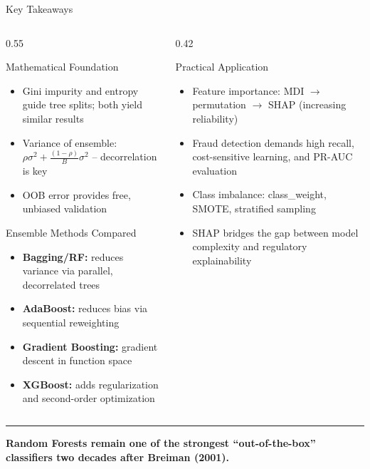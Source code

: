 \documentclass[8pt,aspectratio=169]{beamer}
\newcommand{\bottomnote}[1]{%
\vfill
\vspace{-2mm}
\textcolor{mllavender2}{\rule{\textwidth}{0.4pt}}
\vspace{1mm}
\footnotesize
\textbf{#1}
}
\newenvironment{compactlist}{%
  \begin{itemize}%
    \setlength{\itemsep}{2pt}%
    \setlength{\parskip}{0pt}%
    \setlength{\parsep}{0pt}%
}{%
  \end{itemize}%
}
\begin{document}

\begin{frame}{Key Takeaways}
\begin{columns}[T]
\begin{column}{0.55\textwidth}
\small
\begin{block}{Mathematical Foundation}
\begin{compactlist}
\item Gini impurity and entropy guide tree splits; both yield similar results
\item Variance of ensemble: $\rho\sigma^2 + \frac{(1-\rho)}{B}\sigma^2$ -- decorrelation is key
\item OOB error provides free, unbiased validation
\end{compactlist}
\end{block}

\vspace{0.3em}
\begin{block}{Ensemble Methods Compared}
\begin{compactlist}
\item \textbf{Bagging/RF:} reduces variance via parallel, decorrelated trees
\item \textbf{AdaBoost:} reduces bias via sequential reweighting
\item \textbf{Gradient Boosting:} gradient descent in function space
\item \textbf{XGBoost:} adds regularization and second-order optimization
\end{compactlist}
\end{block}
\end{column}
\begin{column}{0.42\textwidth}
\small
\begin{block}{Practical Application}
\begin{compactlist}
\item Feature importance: MDI $\to$ permutation $\to$ SHAP (increasing reliability)
\item Fraud detection demands high recall, cost-sensitive learning, and PR-AUC evaluation
\item Class imbalance: class\_weight, SMOTE, stratified sampling
\item SHAP bridges the gap between model complexity and regulatory explainability
\end{compactlist}
\end{block}
\end{column}
\end{columns}
\bottomnote{Random Forests remain one of the strongest ``out-of-the-box'' classifiers two decades after Breiman (2001).}
\end{frame}
\end{document}
